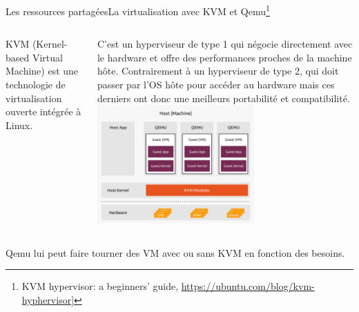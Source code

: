 \documentclass{beamer}
\begin{document}
    \begin{frame}{Les ressources partagées}{La virtualisation avec KVM et Qemu\footnote{\label{ubuntukvm}KVM hypervisor: a beginners’ guide, \url{https://ubuntu.com/blog/kvm-hyphervisor}]}}
        \begin{columns}
            KVM (Kernel-based Virtual Machine) est une technologie de virtualisation ouverte intégrée à Linux.

            C'est un hyperviseur de type 1 qui négocie directement avec le hardware et offre des performances proches de la machine hôte.
            Contrairement à un hyperviseur de type 2, qui doit passer par l'OS hôte pour accéder au hardware mais ces derniers ont donc une meilleurs portabilité et compatibilité.
            \centering
            \includegraphics[width=6cm]{image/kvm-qemu}
        \end{columns}
        \bigbreak
        Qemu lui peut faire tourner des VM avec ou sans KVM en fonction des besoins.
    \end{frame}
\end{document}
